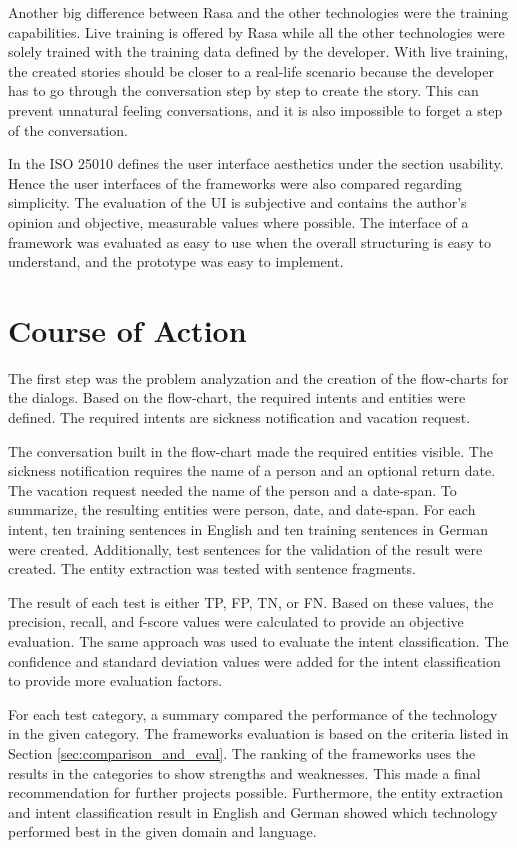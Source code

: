 Another big difference between Rasa and the other technologies were the 
training capabilities.
Live training is offered by Rasa while all the other technologies 
were solely trained with the training data defined by the developer.
With live training, the created stories should be closer 
to a real-life scenario because the developer has to go through the conversation step by step to create the story.
This can prevent unnatural feeling conversations, and it is also impossible to forget a step of the conversation.

In the ISO 25010\cite{iso25010} defines the user interface aesthetics under the section usability. 
Hence the user interfaces of the frameworks were also compared regarding simplicity.
The evaluation of the UI is subjective and contains the author's opinion and objective, measurable values where possible.
The interface of a framework was evaluated as easy to use when the overall structuring is easy to understand, and the prototype was easy to implement.

\section{Course of Action} %
The first step was the problem analyzation and the creation of the flow-charts for the dialogs.
Based on the flow-chart, the required intents and entities were defined.
The required intents are sickness notification and vacation request.

The conversation built in the flow-chart made the required entities visible.
The sickness notification requires the name of a person and an optional return date.
The vacation request needed the name of the person and a date-span.
To summarize, the resulting entities were person, date, and date-span.
For each intent, ten training sentences in English and ten training sentences in German were created.
Additionally, test sentences for the validation of the result were created.
The entity extraction was tested with sentence fragments.

The result of each test is either TP, FP, TN, or FN.
Based on these values, the precision, recall, and f-score values were calculated to provide an objective evaluation.
The same approach was used to evaluate the intent classification.
The confidence and standard deviation values were added for the intent classification to provide more evaluation factors.

For each test category, a summary compared the performance of the technology in the given category.
The frameworks evaluation is based on the criteria listed in Section \ref{sec:comparison_and_eval}.
The ranking of the frameworks uses the results in the categories to show strengths and weaknesses.
This made a final recommendation for further projects possible.
Furthermore, the entity extraction and intent classification result in English and German showed which technology performed best in the given domain and language.